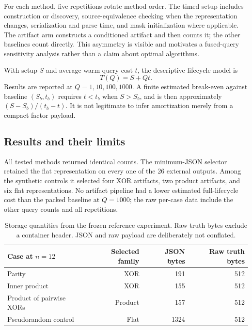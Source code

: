 \documentclass[11pt]{article}
\theoremstyle{definition}\newtheorem{definition}[theorem]{Definition}
\theoremstyle{remark}\newtheorem{remark}[theorem]{Remark}
\begin{document}
For each method, five repetitions rotate method order. The timed setup includes construction or discovery, source-equivalence checking when the representation changes, serialization and parse time, and mask initialization where applicable. The artifact arm constructs a conditioned artifact and then counts it; the other baselines count directly. This asymmetry is visible and motivates a fused-query sensitivity analysis rather than a claim about optimal algorithms.

With setup $S$ and average warm query cost $t$, the descriptive lifecycle model is
\begin{equation}
 T(Q)=S+Qt.\label{eq:lifecycle}
\end{equation}
Results are reported at $Q=1,10,100,1000$. A finite estimated break-even against baseline $(S_b,t_b)$ requires $t<t_b$ when $S>S_b$, and is then approximately $(S-S_b)/(t_b-t)$. It is not legitimate to infer amortization merely from a compact factor payload.

\subsection{Results and their limits}
All tested methods returned identical counts. The minimum-JSON selector retained the flat representation on every one of the 26 external outputs. Among the synthetic controls it selected four XOR artifacts, two product artifacts, and six flat representations. No artifact pipeline had a lower estimated full-lifecycle cost than the packed baseline at $Q=1000$; the raw per-case data include the other query counts and all repetitions.

\begin{table}[ht]
\centering
\begin{tabular}{@{}lrrr@{}}\toprule
Case at $n=12$ & Selected family & JSON bytes & Raw truth bytes\\\midrule
Parity & XOR & 191 & 512\\
Inner product & XOR & 155 & 512\\
Product of pairwise XORs & Product & 157 & 512\\
Pseudorandom control & Flat & 1324 & 512\\\bottomrule
\end{tabular}
\caption{Storage quantities from the frozen reference experiment. Raw truth bytes exclude a container header. JSON and raw payload are deliberately not conflated.}\label{tab:storage}
\end{table}
\end{document}
